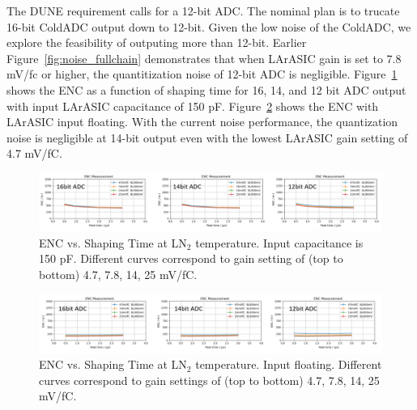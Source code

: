 The DUNE requirement calls for a 12-bit ADC. The nominal plan is to trucate 16-bit ColdADC output down to 
12-bit. Given the low noise of the ColdADC, we explore the feasibility of outputing more than 12-bit.
Earlier Figure~\ref{fig:noise_fullchain} demonstrates that when LArASIC gain is set to 7.8 mV/fc or higher, 
the quantitization noise of 12-bit ADC is negligible. Figure~\ref{fig:noise_quant150pf} 
shows the ENC as a function of shaping time for 16, 14, and 12 bit ADC output with input LArASIC capacitance
of 150 pF. Figure~\ref{fig:noise_quantfloat} shows the ENC with LArASIC input floating. With the 
current noise performance, the quantization noise is negligible at 14-bit output even with the lowest LArASIC gain setting of 4.7 mV/fC.
\begin{figure}[h!]
\centering
  \includegraphics[width=1.0\linewidth]{figures/noise_quant150pf.png}
  \caption{ENC vs. Shaping Time at LN$_2$ temperature. Input capacitance is 150 pF. Different curves 
correspond to gain setting of (top to bottom) 4.7, 7.8, 14, 25 mV/fC.}
  \label{fig:noise_quant150pf}
\end{figure}
\begin{figure}[h!]
\centering
  \includegraphics[width=1.0\linewidth]{figures/noise_quantfloat.png}
  \caption{ENC vs. Shaping Time at LN$_2$ temperature. Input floating. Different curves correspond to 
gain settings of (top to bottom) 4.7, 7.8, 14, 25 mV/fC.}
  \label{fig:noise_quantfloat}
\end{figure}



